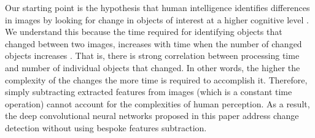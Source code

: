 \documentclass[times, 5p]{elsarticle}
\begin{document}
Our starting point is  the hypothesis that human intelligence identifies differences in images by looking for change in objects of interest at a higher cognitive level \citep{Varghese_2018_ECCV_Workshops}. We understand this because the time required for identifying objects that changed between two images, increases  with time when the number of changed objects increases \citep{TREISMAN198097}. That is, there is strong correlation between processing time and number of individual objects that changed. In other words,  the higher the complexity of the changes the more time is required to accomplish it.  
Therefore, simply subtracting extracted features from images (which is a constant time operation) cannot account for the complexities of human perception. As a result, the deep convolutional neural networks proposed in this paper address change detection without using bespoke features subtraction. 
\end{document}
